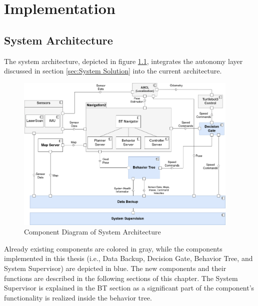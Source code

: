 \chapter{Implementation}
\label{cha:implementierung}

\section{System Architecture}

The system architecture, depicted in figure \ref{fig:component_diagram}, integrates the autonomy layer discussed in section \ref{sec:System Solution} into the current architecture. 


\begin{figure}[ht]
	\centering
	\includegraphics[width=0.95\textwidth]{images/component_diagram_bt.png}
	\caption{Component Diagram of System Architecture}
	\label{fig:component_diagram}
\end{figure}

Already existing components are colored in gray, while the components implemented in this thesis (i.e., Data Backup, Decision Gate, Behavior Tree, and System Supervisor) are depicted in blue. The new components and their functions are described in the following sections of this chapter. The System Supervisor is explained in the BT section as a significant part of the component's functionality is realized inside the behavior tree.

